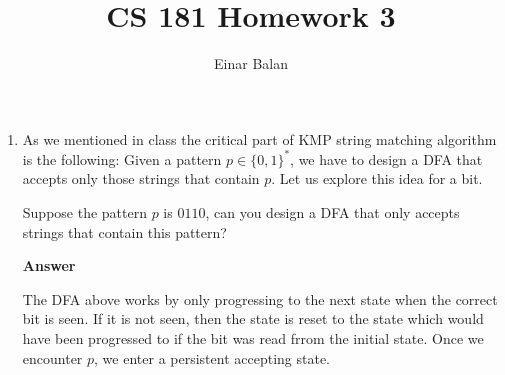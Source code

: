 \documentclass[11pt]{article}
\title{\bf{CS 181 Homework 3}}
\author{ Einar Balan }
\date{}
\newcommand \kw[1]{\textbf{#1}}
\newenvironment{answer}{
\vspace{.5cm}
\begin{mdframed}[]
    \kw{Answer} 
}
{
\end{mdframed}
\pagebreak
}
\begin{document}
\maketitle



\begin{enumerate}


\item As we mentioned in class the critical part of KMP string matching algorithm is the following: Given a pattern $p \in \{0,1\}^*$, we have to design a DFA that accepts only those strings that contain $p$. Let us explore this idea for a bit.

Suppose the pattern $p$ is $0110$, can you design a DFA that only accepts strings that contain this pattern? 

\begin{answer}
    \begin{center}
    \end{center}

    The DFA above works by only progressing to the next state when the correct bit is seen. If it is not seen, then the state is reset to the state which would have been progressed to if the bit was read frrom the initial state. Once we encounter $p$, we enter a persistent accepting state.


\end{answer}
\end{enumerate}
\end{document}
